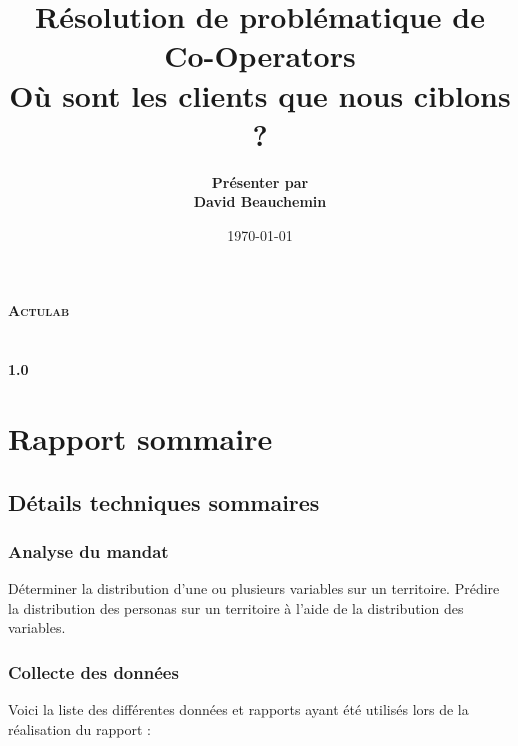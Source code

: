 \documentclass[11pt,french]{report}\usepackage[]{graphicx}\usepackage[]{color}
\title{Résolution de problématique de \\ Co-Operators \\ \bigskip Où sont les clients que nous ciblons ?}
\author{\textbf{Présenter par \\ David Beauchemin}}
\date{\today}
\def\versionnumber{1.0}
\begin{document}
\makeatletter
  \begin{titlepage}
  \centering
      {\LARGE \textbf{\textsc{Actulab}}}\\
    \vspace{2cm}
    \vspace{2cm}
      {\LARGE \textbf{\@title}} \\
    \vspace{2cm}
    \vfill
       {\Large \@author} \\
    \vspace{8cm}
        {\large\textbf{\versionnumber}}\\
    \vfill
  \end{titlepage}
\makeatother


\pagebreak




\tableofcontents

\newpage

\chapter*{Rapport sommaire}

\section*{Détails techniques sommaires}

\subsection*{Analyse du mandat}
Déterminer la distribution d'une ou plusieurs variables sur un territoire. Prédire la distribution des personas sur un territoire à l'aide de la distribution des variables.

\subsection*{Collecte des données}
Voici la liste des différentes données et rapports ayant été utilisés lors de la réalisation du rapport :
\end{document}
